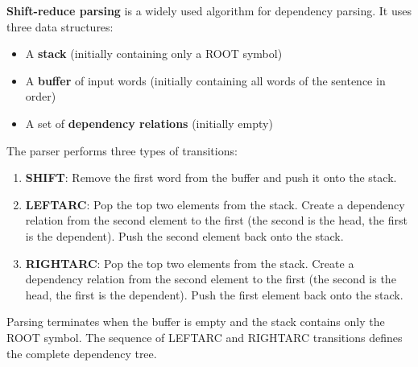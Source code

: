 \documentclass[11pt,a4paper]{article}
\begin{document}
\textbf{Shift-reduce parsing} is a widely used algorithm for dependency parsing. It uses three data structures:
\begin{itemize}
    \item A \textbf{stack} (initially containing only a ROOT symbol)
    \item A \textbf{buffer} of input words (initially containing all words of the sentence in order)
    \item A set of \textbf{dependency relations} (initially empty)
\end{itemize}

The parser performs three types of transitions:
\begin{enumerate}
    \item \textbf{SHIFT}: Remove the first word from the buffer and push it onto the stack.
    \item \textbf{LEFTARC}: Pop the top two elements from the stack. Create a dependency relation from the second element to the first (the second is the head, the first is the dependent). Push the second element back onto the stack.
    \item \textbf{RIGHTARC}: Pop the top two elements from the stack. Create a dependency relation from the second element to the first (the second is the head, the first is the dependent). Push the first element back onto the stack.
\end{enumerate}

Parsing terminates when the buffer is empty and the stack contains only the ROOT symbol. The sequence of LEFTARC and RIGHTARC transitions defines the complete dependency tree.
\end{document}
